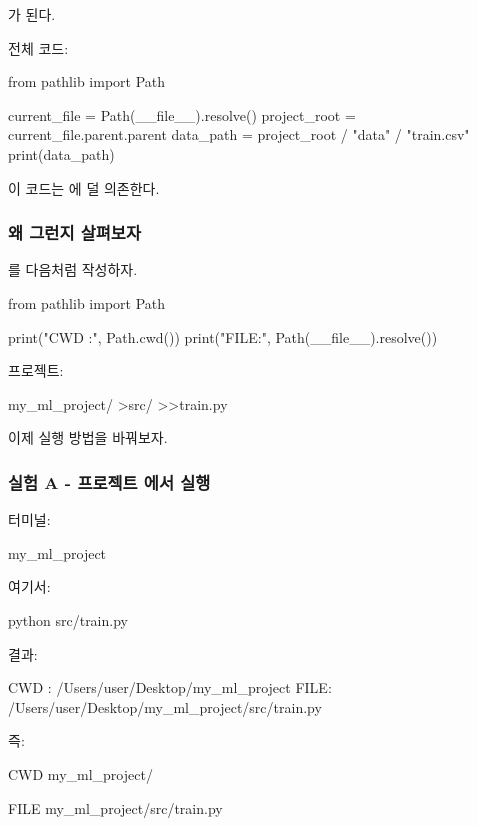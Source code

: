 가 된다.

전체 코드:

\begin{dhkcode}
from pathlib import Path

current_file = Path(__file__).resolve()
project_root = current_file.parent.parent
data_path = project_root / "data" / "train.csv"
print(data_path)
\end{dhkcode}

이 코드는 에 덜 의존한다.

\subsubsection{왜 그런지 살펴보자}

를 다음처럼 작성하자.

\begin{dhkcode}
from pathlib import Path

print("CWD :", Path.cwd())
print("FILE:", Path(__file__).resolve())
\end{dhkcode}

프로젝트:

\begin{dhkdir}
my_ml_project/
>src/
>>train.py
\end{dhkdir}


이제 실행 방법을 바꿔보자.

\subsubsection{실험 A - 프로젝트 에서 실행}

터미널:

\begin{dhkzsh}
my_ml_project %
\end{dhkzsh}

여기서:

\begin{dhkzsh}
python src/train.py
\end{dhkzsh}

결과:

\begin{dhkzsh}
CWD : /Users/user/Desktop/my_ml_project
FILE: /Users/user/Desktop/my_ml_project/src/train.py
\end{dhkzsh}

즉:

\begin{dhkzsh}
CWD
my_ml_project/

FILE
my_ml_project/src/train.py
\end{dhkzsh}

